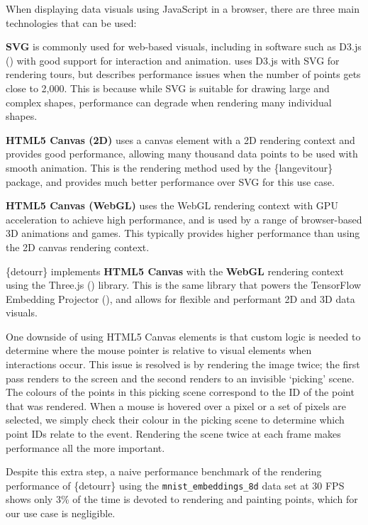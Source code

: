 When displaying data visuals using JavaScript in a browser, there are
three main technologies that can be used:

\textbf{SVG} is commonly used for web-based visuals, including in
software such as D3.js (\citet{bostock2011d3}) with good support for
interaction and animation. \citet{kipp2019connecting} uses D3.js with
SVG for rendering tours, but describes performance issues when the
number of points gets close to 2,000. This is because while SVG is
suitable for drawing large and complex shapes, performance can degrade
when rendering many individual shapes.

\textbf{HTML5 Canvas (2D)} uses a canvas element with a 2D rendering
context and provides good performance, allowing many thousand data
points to be used with smooth animation. This is the rendering method
used by the \{langevitour\} package, and provides much better
performance over SVG for this use case.

\textbf{HTML5 Canvas (WebGL)} uses the WebGL rendering context with GPU
acceleration to achieve high performance, and is used by a range of
browser-based 3D animations and games. This typically provides higher
performance than using the 2D canvas rendering context.

\{detourr\} implements \textbf{HTML5 Canvas} with the \textbf{WebGL}
rendering context using the Three.js (\citet{threejs}) library. This is
the same library that powers the TensorFlow Embedding Projector
(\citet{smilkov2016embedding}), and allows for flexible and performant
2D and 3D data visuals.

One downside of using HTML5 Canvas elements is that custom logic is
needed to determine where the mouse pointer is relative to visual
elements when interactions occur. This issue is resolved is by rendering
the image twice; the first pass renders to the screen and the second
renders to an invisible `picking' scene. The colours of the points in
this picking scene correspond to the ID of the point that was rendered.
When a mouse is hovered over a pixel or a set of pixels are selected, we
simply check their colour in the picking scene to determine which point
IDs relate to the event. Rendering the scene twice at each frame makes
performance all the more important.

Despite this extra step, a naive performance benchmark of the rendering
performance of \{detourr\} using the \texttt{mnist\_embeddings\_8d} data
set at 30 FPS shows only 3\% of the time is devoted to rendering and
painting points, which for our use case is negligible.

